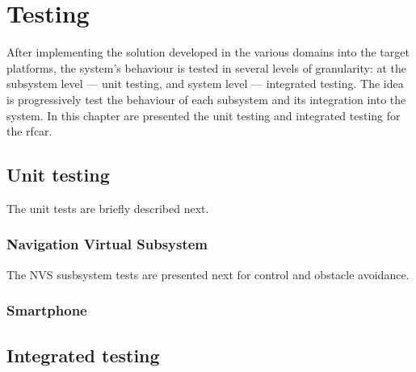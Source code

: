 \chapter{Testing}%
\label{ch:testing}
After implementing the solution developed in the various domains into the
target platforms, the system's behaviour is tested in several levels of
granularity: at the subsystem level --- unit testing, and system level ---
integrated testing. The idea is progressively test the behaviour of each
subsystem and its integration into the system.
In this chapter are presented the unit testing and integrated testing for the \gls{rfcar}.
%
\section{Unit testing}%
\label{sec:unit-testing}
The unit tests are briefly described next.
    \subsection{Navigation Virtual Subsystem}%
    \label{sec:navig-virt-subsyst-implem}
The NVS susbsystem tests are presented next for control and obstacle avoidance.
    
    
    \subsection{Smartphone}%
    \label{sec:smartphone-testing}
    
\section{Integrated testing}%
\label{sec:integrated-testing}

%
%
